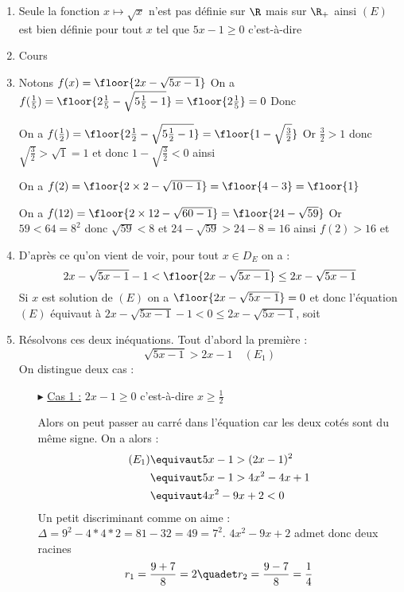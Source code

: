 \documentclass[a4paper, 11pt,reqno]{article}
\begin{document}
\begin{correction}
\begin{enumerate}
\item Seule la fonction $x\mapsto \sqrt{x}$ n'est pas définie sur $\R$ mais sur $\R_+$ ainsi $(E)$ est bien définie pour tout $x$ tel que $5x-1\geq 0$ c'est-à-dire 
\conclusion{ $D_E=]\frac{1}{5},+\infty[$}
\item Cours 

\item Notons $f(x) = \floor{2x-\sqrt{5x-1} }$ 
On a $f(\frac{1}{5}) = \floor{2\frac{1}{5}-\sqrt{5\frac{1}{5}-1} }= \floor{2\frac{1}{5}} =0$
Donc 

On a $f(\frac{1}{2} )  =\floor{2\frac{1}{2}-\sqrt{5\frac{1}{2}-1} } = \floor{1-\sqrt{\frac{3}{2} }}$ Or $\frac{3}{2}> 1 $ donc 
$\sqrt{\frac{3}{2}} >\sqrt{1}=1$ et donc 
$1-\sqrt{\frac{3}{2} }<0$ ainsi  

On a $f(2) = \floor{2\times 2-\sqrt{10-1}} =\floor{4-3}=\floor{1}$

On  a $f(12) = \floor{2\times 12-\sqrt{60-1}}=\floor{24-\sqrt{59}}$ 
Or$ 59<64=8^2$ donc  $\sqrt{59} < 8 $ et 
$24-\sqrt{59}> 24-8=16$ ainsi $f(2)>16 $ et 


\item D'après ce qu'on vient de voir, pour tout $x\in D_E$ on a :
$$2x-\sqrt{5x-1} -1<\floor{2x-\sqrt{5x-1} } \leq 2x-\sqrt{5x-1} $$
Si $x$ est solution de $(E)$ on a $\floor{2x-\sqrt{5x-1} }=0$ et donc l'équation $(E)$ équivaut à $2x-\sqrt{5x-1} -1<0 \leq 2x-\sqrt{5x-1} $, soit 

\item Résolvons ces deux inéquations. Tout d'abord la première :
$$\sqrt{5x-1} >2x-1 \quad(E_1)$$
On distingue deux cas : 
\begin{itemize}
\item[$\blacktriangleright$] \underline{Cas 1 :} $2x-1\geq 0$ c'est-à-dire $x\geq \frac{1}{2}$

Alors on peut passer au carré dans l'équation car les deux cotés sont du même signe. On a alors : 
\begin{align*}
(E_1)& \equivaut 5x-1 > (2x-1) ^2\\
& \equivaut 5x-1 > 4x^2-4x+1\\
& \equivaut 4x^2-9x+2<0
\end{align*}
Un petit discriminant comme on aime : 
$\Delta = 9^2 - 4*4*2 = 81- 32= 49 =7^2$. 
$4x^2-9x+2$ admet donc deux racines 
$$r_1 = \frac{9+7}{8}=2 \quadet r_2 =\frac{9-7}{8} = \frac{1}{4}$$


\end{itemize}
\end{enumerate}
\end{correction}
\end{document}

